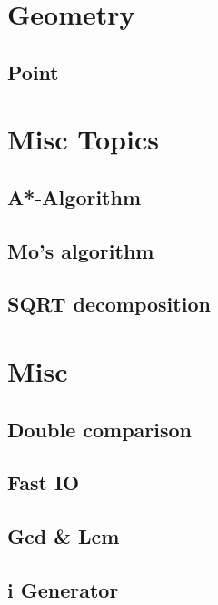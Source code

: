 \section{Geometry}
\subsection{Point}
\raggedbottom
\hrulefill


\section{Misc Topics}
\subsection{A*-Algorithm}
\raggedbottom
\hrulefill
\subsection{Mo's algorithm}
\raggedbottom
\hrulefill
\subsection{SQRT decomposition}
\raggedbottom
\hrulefill


\section{Misc}
\subsection{Double comparison}
\raggedbottom
\hrulefill
\subsection{Fast IO}
\raggedbottom
\hrulefill
\subsection{Gcd \& Lcm}
\raggedbottom
\hrulefill
\subsection{i Generator}
\raggedbottom
\hrulefill
